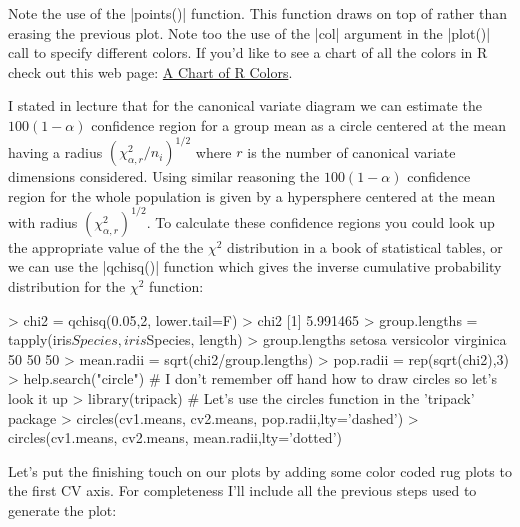 Note the use of the |points()| function. This function draws on top of rather than erasing the previous plot.  Note too the use of the |col| argument in the |plot()| call to specify different colors.  If you'd like to see a chart of all the colors in R check out this web page: \href{http://research.stowers-institute.org/efg/R/Color/Chart/}{A Chart of R Colors}.

I stated in lecture that for the canonical variate diagram we can estimate the $100(1-\alpha)$ confidence region for a group mean as a circle centered at the mean having a radius $(\chi^{2}_{\alpha,r}/n_i)^{1/2}$ where $r$ is the number of canonical variate dimensions considered. Using similar reasoning the $100(1-\alpha)$ confidence region for the whole population is given by a hypersphere centered at the mean with radius $(\chi^{2}_{\alpha,r})^{1/2}$.
To calculate these confidence regions you could look up the appropriate value of the the  $\chi^2$ distribution in a book of statistical tables, or we can use the |qchisq()| function which gives the inverse cumulative probability distribution for the $\chi^2$ function:

\begin{R}
> chi2 = qchisq(0.05,2, lower.tail=F)
> chi2
[1] 5.991465
> group.lengths = tapply(iris$Species, iris$Species, length)
> group.lengths
    setosa versicolor  virginica
        50         50         50
> mean.radii = sqrt(chi2/group.lengths)
> pop.radii = rep(sqrt(chi2),3)
> help.search("circle")  # I don't remember off hand how to draw circles so let's look it up
> library(tripack) # Let's use the circles function in the 'tripack' package
> circles(cv1.means, cv2.means, pop.radii,lty='dashed')
> circles(cv1.means, cv2.means, mean.radii,lty='dotted')
\end{R}

Let's put the finishing touch on our plots by adding some color coded rug plots to the first CV axis. For completeness I'll include all the previous steps used to generate the plot:



